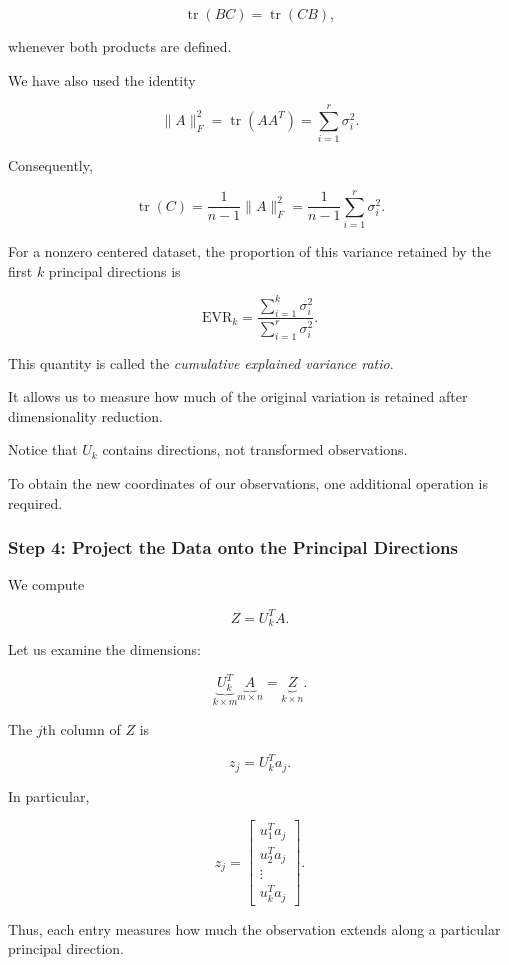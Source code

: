 \documentclass[11pt]{article}
\begin{document}
\[
\operatorname{tr}(BC)
=
\operatorname{tr}(CB),
\]

whenever both products are defined.

We have also used the identity

\[
\|A\|_F^2
=
\operatorname{tr}(AA^T)
=
\sum_{i=1}^{r}\sigma_i^2.
\]

Consequently,

\[
\boxed{
\operatorname{tr}(C)
=
\frac{1}{n-1}\|A\|_F^2
=
\frac{1}{n-1}
\sum_{i=1}^{r}\sigma_i^2.
}
\]


For a nonzero centered dataset,
the proportion of this variance
retained by the first $k$
principal directions is

\[
\boxed{
\mathrm{EVR}_k
=
\frac{\displaystyle
\sum_{i=1}^{k}\sigma_i^2}
{\displaystyle
\sum_{i=1}^{r}\sigma_i^2}.
}
\]

This quantity is called the
\textit{cumulative explained
variance ratio}.

It allows us to measure
how much of the original
variation is retained
after dimensionality
reduction.

Notice that $U_k$ contains
directions, not transformed
observations.

To obtain the new coordinates
of our observations, one
additional operation is required.

\subsubsection*{Step 4: Project the Data
onto the Principal Directions}

We compute

\[
\boxed{
Z=U_k^TA.
}
\]

Let us examine the dimensions:

\[
\underbrace{U_k^T}_{k\times m}
\underbrace{A}_{m\times n}
=
\underbrace{Z}_{k\times n}.
\]

The $j$th column of $Z$ is

\[
z_j=U_k^Ta_j.
\]

In particular,

\[
z_j=
\begin{bmatrix}
u_1^Ta_j\\
u_2^Ta_j\\
\vdots\\
u_k^Ta_j
\end{bmatrix}.
\]

Thus, each entry measures
how much the observation
extends along a particular
principal direction.
\end{document}
